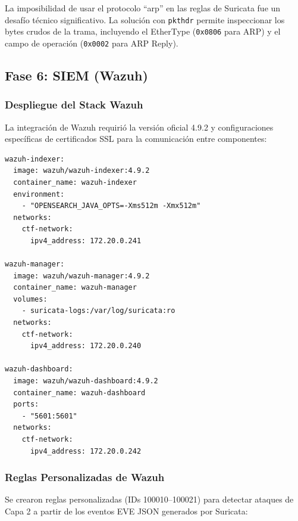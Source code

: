 \documentclass[12pt, a4paper]{article}
\begin{document}
\begin{infobox}
La imposibilidad de usar el protocolo ``arp'' en las reglas de Suricata fue un desaf\'io t\'ecnico significativo. La soluci\'on con \texttt{pkthdr} permite inspeccionar los bytes crudos de la trama, incluyendo el EtherType (\texttt{0x0806} para ARP) y el campo de operaci\'on (\texttt{0x0002} para ARP Reply).
\end{infobox}

\subsection{Fase 6: SIEM (Wazuh)}

\subsubsection{Despliegue del Stack Wazuh}

La integraci\'on de Wazuh requiri\'o la versi\'on oficial 4.9.2 y configuraciones espec\'ificas de certificados SSL para la comunicaci\'on entre componentes:

\begin{lstlisting}[style=yamlstyle, caption={Configuraci\'on del stack Wazuh (fragmento)}]
wazuh-indexer:
  image: wazuh/wazuh-indexer:4.9.2
  container_name: wazuh-indexer
  environment:
    - "OPENSEARCH_JAVA_OPTS=-Xms512m -Xmx512m"
  networks:
    ctf-network:
      ipv4_address: 172.20.0.241

wazuh-manager:
  image: wazuh/wazuh-manager:4.9.2
  container_name: wazuh-manager
  volumes:
    - suricata-logs:/var/log/suricata:ro
  networks:
    ctf-network:
      ipv4_address: 172.20.0.240

wazuh-dashboard:
  image: wazuh/wazuh-dashboard:4.9.2
  container_name: wazuh-dashboard
  ports:
    - "5601:5601"
  networks:
    ctf-network:
      ipv4_address: 172.20.0.242
\end{lstlisting}

\subsubsection{Reglas Personalizadas de Wazuh}

Se crearon reglas personalizadas (IDs 100010--100021) para detectar ataques de Capa 2 a partir de los eventos EVE JSON generados por Suricata:
\end{document}
